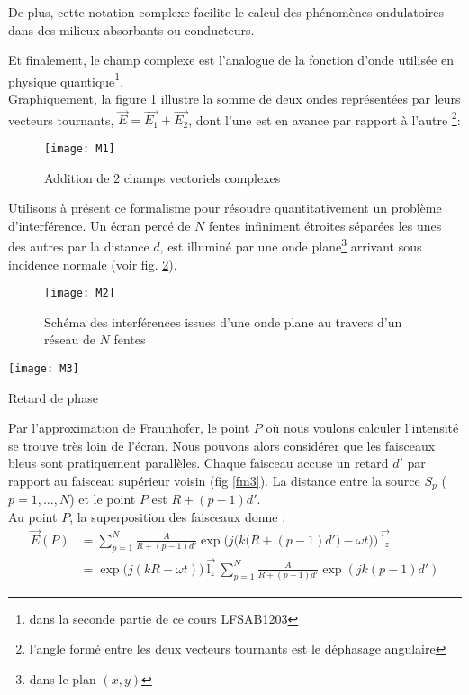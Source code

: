 De plus,  cette notation complexe facilite le calcul des phénomènes ondulatoires dans des milieux absorbants ou conducteurs. 

Et finalement, le champ complexe est l'analogue de la fonction d'onde utilisée en physique quantique\footnote{dans la seconde partie de ce cours LFSAB1203}.\\

Graphiquement, la figure \ref{M1} illustre la somme de deux ondes représentées par leurs vecteurs tournants, $\overset\rightarrow{E}=\overset\rightarrow{E_1}+\overset\rightarrow{E_2}$, dont l'une est en avance par rapport à l'autre \footnote{l'angle formé entre les deux vecteurs tournants est le déphasage angulaire}:
\begin{figure}[htb]
\centering
\texttt{[image: M1]}
\caption{Addition de 2 champs vectoriels complexes}
\label{M1}
\end{figure}

Utilisons à présent ce formalisme pour résoudre quantitativement un problème d'interférence. Un écran percé de $N$ fentes infiniment étroites séparées les unes des autres par la distance $d$, est illuminé par une onde plane\footnote{dans le plan $(x,y)$} arrivant sous incidence normale (voir fig. \ref{M2}).
\begin{figure}[htb]
\centering
\texttt{[image: M2]}
\caption{Schéma des interférences issues d'une onde plane au travers d'un réseau de $N$ fentes}
\label{M2}
\end{figure}

\begin{marginfigure}[0cm]
	\texttt{[image: M3]}
	\caption{Retard de phase}
	\label{fm3}
\end{marginfigure}

Par l'approximation de Fraunhofer, le point $P$ où nous voulons calculer l'intensité se trouve très loin de l'écran. Nous pouvons alors considérer que les faisceaux bleus sont pratiquement parallèles. Chaque faisceau accuse un retard $d'$ par rapport au faisceau supérieur voisin (fig \ref{fm3}). La distance entre la source $S_p$ ($p=1,\ldots, N$) et le point $P$ est $R+(p-1)d'$.\\

Au point $P$, la superposition des faisceaux donne :
\begin{align*}
\overset\rightarrow{E}(P) & = \sum\limits_{p=1}^N \frac{A}{R+(p-1)d'}\exp\bigg(j\Big(k\big(R+(p-1)d'\big)-\omega t\Big)\bigg)\:\overset\rightarrow{\mbox{l}_z} \\
& = \exp\Big(j(kR-\omega t)\Big)\:\overset\rightarrow{\mbox{l}_z}\: \sum\limits_{p=1}^N \frac{A}{R+(p-1)d'}\exp(jk(p-1)d')
\end{align*}

